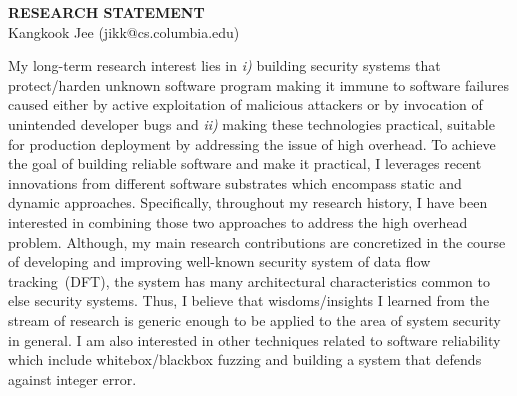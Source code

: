 \documentclass[letterpaper, 10pt]{article}
\begin{document}
\begin{small}

\begin{center}
{\LARGE \bf RESEARCH STATEMENT}\\
\vspace*{0.1cm}
{\normalsize Kangkook Jee (jikk@cs.columbia.edu)}
\end{center}



My long-term research interest lies in {\it i)} building security systems that
protect/harden unknown software program making it immune to software failures
caused either by active exploitation of malicious attackers or by invocation of
unintended developer bugs and {\it ii)} making these technologies practical,
suitable for production deployment by addressing the issue of high overhead.
%
To achieve the goal of building reliable software and make it practical, I
leverages recent innovations from different software substrates which encompass
static and dynamic approaches. Specifically, throughout my research history, I
have been interested in combining those two approaches to address the high
overhead problem. 
%
Although, my main research contributions are concretized in the course of
developing and improving well-known security system of data flow
tracking~(DFT), the system has many architectural characteristics common to
else security systems.  Thus, I believe that wisdoms/insights I learned from
the stream of research is generic enough to be applied to the area of system
security in general. 
%
I am also interested in other techniques related to software reliability which
include whitebox/blackbox fuzzing and building a system that defends against
integer error. 


\end{small}
\end{document}
